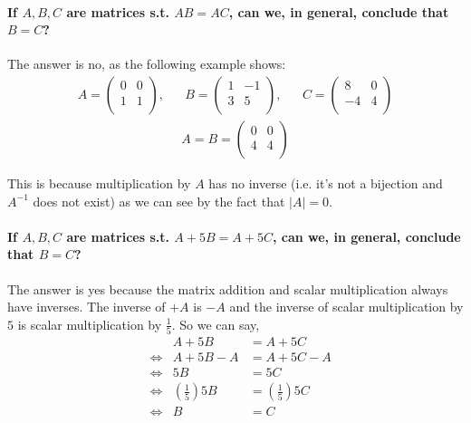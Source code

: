 \documentclass[MathsNotesBase.tex]{subfiles}
\date{\vspace{-6ex}}
\begin{document}


	\paragraph{If $A,B,C$ are matrices s.t. $AB = AC$, can we, in general, conclude that $B = C$?}
	The answer is no, as the following example shows:
	\begin{align*}
		A = 
		\begin{pmatrix}
		0 & 0\\
		1 & 1\\
		\end{pmatrix},&&
		B = 
		\begin{pmatrix}
		1 & -1\\
		3 & 5\\
		\end{pmatrix},&&
		C = 
		\begin{pmatrix}
		8 & 0\\
		-4 & 4\\
		\end{pmatrix}
	\end{align*}
	\begin{align*}
	A = B = 
	\begin{pmatrix}
	0 & 0\\
	4 & 4\\
	\end{pmatrix}
	\end{align*}
	
	This is because multiplication by $A$ has no inverse (i.e. it's not a bijection and $A^{-1}$ does not exist) as we can see by the fact that $\vert{A}\vert = 0$.
	
	\paragraph{If $A,B,C$ are matrices s.t. $A + 5B = A + 5C$, can we, in general, conclude that $B = C$?}
	The answer is yes because the matrix addition and scalar multiplication always have inverses. The inverse of $+ A$ is $- A$ and the inverse of scalar multiplication by $5$ is scalar multiplication by $\frac{1}{5}$. So we can say,
	\begin{align*}
	&& A + 5B &= A + 5C\\[8pt]
	&\iff & A + 5B - A &= A + 5C - A\\[8pt]
	&\iff & 5B &= 5C\\[8pt]
	&\iff & \left(\frac{1}{5}\right)5B &= \left(\frac{1}{5}\right)5C\\[8pt]
	&\iff & B &= C
	\end{align*}
	
\end{document}
